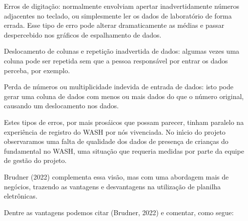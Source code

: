 \documentclass[
12pt,		%
openright,	%
twoside,  %
a4paper,			%
chapter=TITLE,		%
english,			%
french,				%
spanish,			%
brazil				%
]{USPSC-classe/USPSC}
\begin{document}
\begin{alineas}
\item Erros de digita\c{c}\~ao: normalmente envolviam apertar inadvertidamente n\'umeros adjacentes no teclado, ou simplesmente ler os dados de laborat\'orio de forma errada. Esse tipo de erro pode alterar dramaticamente as m\'edias e passar despercebido nos gr\'aficos de espalhamento de dados.
\item Deslocamento de colunas e repeti\c{c}\~ao inadvertida de dados: algumas vezes uma coluna pode ser repetida sem que a pessoa respons\'avel por entrar os dados perceba, por exemplo.
\item Perda de n\'umeros ou multiplicidade indevida de entrada de dados: isto pode gerar uma coluna de dados com menos ou mais dados do que o n\'umero original, causando um deslocamento nos dados.
\end{alineas}

Estes tipos de erros, por mais pros\'aicos que possam parecer, tinham paralelo na experi\^encia de registro do WASH por n\'os vivenciada. No in\'{\i}cio do projeto observaramos uma falta de qualidade dos dados de presen\c{c}a de crian\c{c}as do fundamental no WASH, uma situa\c{c}\~ao que requeria medidas por parte da equipe de gest\~ao do projeto.














 Brudner (2022) complementa essa vis\~ao, mas com uma abordagem mais de neg\'ocios, trazendo as vantagens e desvantagens na utiliza\c{c}\~ao de planilha eletr\^onicas.














Dentre as vantagens podemos citar (Brudner, 2022) e comentar, como segue:
\end{document}
